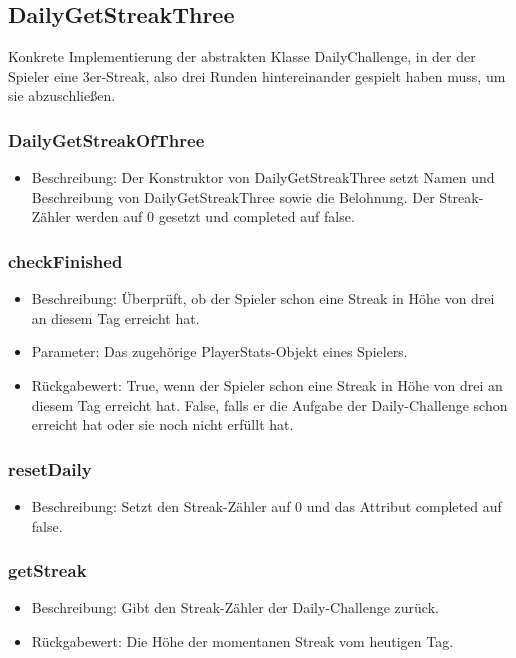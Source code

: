 \documentclass[a4paper]{scrreprt}
\begin{document}
    \subsection{DailyGetStreakThree}
    Konkrete Implementierung der abstrakten Klasse DailyChallenge, in der der Spieler eine 3er-Streak, also drei Runden hintereinander gespielt haben muss, um sie abzuschließen.
    \subsubsection{DailyGetStreakOfThree}
    \begin{itemize}
        \item Beschreibung: Der Konstruktor von DailyGetStreakThree setzt Namen und Beschreibung von DailyGetStreakThree sowie die Belohnung. Der Streak-Zähler werden auf 0 gesetzt und completed auf false.
    \end{itemize}
    \subsubsection{checkFinished}
    \begin{itemize}
        \item Beschreibung: Überprüft, ob der Spieler schon eine Streak in Höhe von drei an diesem Tag erreicht hat.
        \item Parameter: Das zugehörige PlayerStats-Objekt eines Spielers.
        \item Rückgabewert: True, wenn der Spieler schon eine Streak in Höhe von drei an diesem Tag erreicht hat. False, falls er die Aufgabe der Daily-Challenge schon erreicht hat oder sie noch nicht erfüllt hat.
    \end{itemize}
    \subsubsection{resetDaily}
    \begin{itemize}
        \item Beschreibung: Setzt den Streak-Zähler auf 0 und das Attribut completed auf false.
    \end{itemize}
    \subsubsection{getStreak}
    \begin{itemize}
        \item Beschreibung: Gibt den Streak-Zähler der Daily-Challenge zurück.
        \item Rückgabewert: Die Höhe der momentanen Streak vom heutigen Tag.
    \end{itemize}
\end{document}
